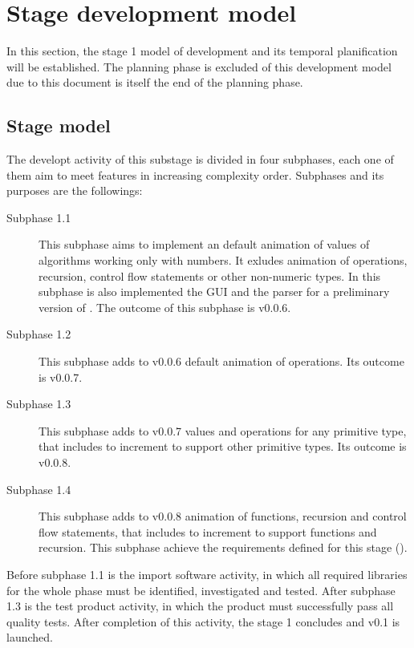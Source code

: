 \documentclass[twocolumn, 9pt]{extarticle}
\begin{document}
\section{Stage development model}
\label{sec:stage-development-life-cycle}
In this section, the \favp stage 1 model of development and its
temporal planification will be established. The planning phase is
excluded of this development model due to this document is itself the
end of the planning phase.

\subsection{Stage model}
\label{ssec:stage-model}
The developt activity of this substage is divided in
four subphases, each one of them aim to meet features in increasing
complexity order. Subphases and its purposes are the followings:

\begin{description}
  \item[Subphase 1.1] This subphase aims to implement an default
    animation of values of algorithms working only with numbers. It
    exludes animation of operations, recursion, control flow
    statements or other non-numeric types. In this subphase is also
    implemented the GUI and the parser for a preliminary version of
    \favpp. The outcome of this subphase is \fav v0.0.6.
  \item[Subphase 1.2] This subphase adds to \fav v0.0.6 default
    animation of operations. Its outcome is \fav v0.0.7.
  \item[Subphase 1.3] This subphase adds to \fav v0.0.7 values and
    operations for any primitive type, that includes to increment
    \favpp to support other primitive types. Its outcome is \fav
    v0.0.8.
  \item[Subphase 1.4] This subphase adds to \fav v0.0.8 animation of
    functions, recursion and control flow statements, that includes to
    increment \favpp to support functions and recursion. This subphase
    achieve the requirements defined for this stage
    ().
\end{description}

Before subphase 1.1 is the import software activity, in which all
required libraries for the whole phase must be identified,
investigated and tested. After subphase 1.3 is the test product
activity, in which the product must successfully pass all quality
tests. After completion of this activity, the \favp stage 1 concludes
and \fav v0.1 is launched.
\end{document}
